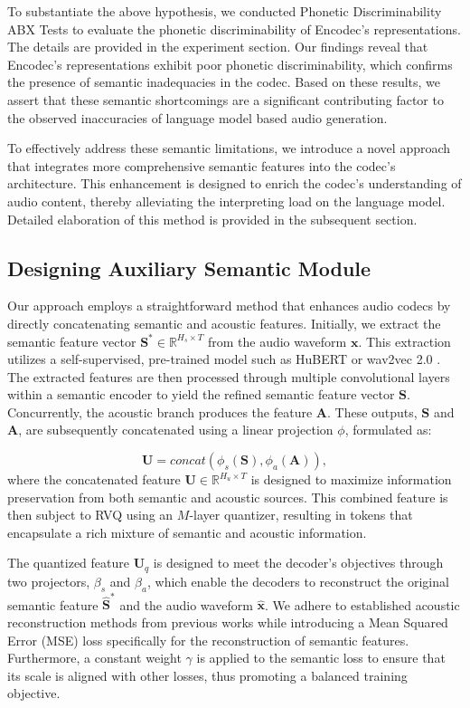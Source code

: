 To substantiate the above hypothesis, we conducted Phonetic Discriminability ABX Tests to evaluate the phonetic discriminability of Encodec's representations. The details are provided in the experiment section. Our findings reveal that Encodec's representations exhibit poor phonetic discriminability, which confirms the presence of semantic inadequacies in the codec. Based on these results, we assert that these semantic shortcomings are a significant contributing factor to the observed inaccuracies of language model based audio generation. 


To effectively address these semantic limitations, we introduce a novel approach that integrates more comprehensive semantic features into the codec's architecture. This enhancement is designed to enrich the codec's understanding of audio content, thereby alleviating the interpreting load on the language model. Detailed elaboration of this method is provided in the subsequent section.


\subsection{Designing Auxiliary Semantic Module}

Our approach employs a straightforward method that enhances audio codecs by directly concatenating semantic and acoustic features. Initially, we extract the semantic feature vector $\textbf{S}^* \in \mathbb{R}^{H_s \times T}$ from the audio waveform $\textbf{x}$. This extraction utilizes a self-supervised, pre-trained model such as HuBERT \cite{hsu2021hubert} or wav2vec 2.0 \cite{baevski2020wav2vec}. The extracted features are then processed through multiple convolutional layers within a semantic encoder to yield the refined semantic feature vector $\textbf{S}$. Concurrently, the acoustic branch produces the feature $\textbf{A}$. These outputs, $\textbf{S}$ and $\textbf{A}$, are subsequently concatenated using a linear projection $\phi$, formulated as:

\begin{equation}
\textbf{U} =  concat(\phi_s(\textbf{S}), \phi_a(\textbf{A})) ,
\end{equation}
where the concatenated feature $\textbf{U} \in \mathbb{R}^{H_u \times T}$ is designed to maximize information preservation from both semantic and acoustic sources. This combined feature is then subject to RVQ using an $M$-layer quantizer, resulting in tokens that encapsulate a rich mixture of semantic and acoustic information.

The quantized feature $\textbf{U}_q$ is designed to meet the decoder's objectives through two projectors, $\beta_s$ and $\beta_a$, which enable the decoders to reconstruct the original semantic feature $\hat{\textbf{S}}^*$ and the audio waveform $\hat{\textbf{x}}$. We adhere to established acoustic reconstruction methods from previous works while introducing a Mean Squared Error (MSE) loss specifically for the reconstruction of semantic features. Furthermore, a constant weight $\gamma$ is applied to the semantic loss to ensure that its scale is aligned with other losses, thus promoting a balanced training objective.